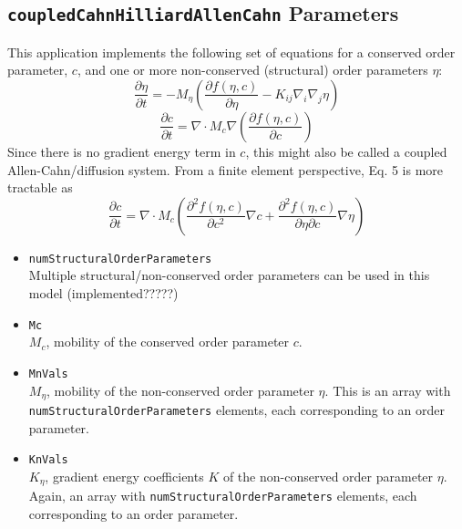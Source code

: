 \documentclass[11pt]{article}
\begin{document}
\subsection{\texttt{coupledCahnHilliardAllenCahn} Parameters}
This application implements the following set of equations for a conserved order parameter, $c$, and one or more non-conserved (structural) order parameters $\eta$:
\begin{equation}
\frac{\partial \eta}{\partial t} = -M_\eta \left( \frac{\partial f(\eta,c)}{\partial \eta} - K_{ij} \nabla_i \nabla_j \eta \right)
\end{equation}
\begin{equation}
\frac{\partial c}{\partial t} = \nabla \cdot M_c \nabla \left( \frac{\partial f(\eta,c)}{\partial c} \right)
\end{equation}
Since there is no gradient energy term in $c$, this might also be called a coupled Allen-Cahn/diffusion system.  From a finite element perspective, Eq. 5 is more tractable as
\begin{equation}
\frac{\partial c}{\partial t} = \nabla \cdot M_c \left( \frac{\partial^2 f(\eta,c)}{\partial c^2} \nabla c + \frac{\partial^2 f(\eta,c)}{\partial \eta \partial c } \nabla \eta \right)
\end{equation}
\begin{itemize}
\item \texttt{numStructuralOrderParameters}\\
	Multiple structural/non-conserved order parameters can be used in this model (implemented?????)
\item \texttt{Mc} \\
	$M_c$, mobility of the conserved order parameter $c$.
\item \texttt{MnVals} \\
	$M_\eta$, mobility of the non-conserved order parameter $\eta$.  This is an array with \texttt{numStructuralOrderParameters} elements, each corresponding to an order parameter.
\item \texttt{KnVals} \\
	$K_\eta$, gradient energy coefficients $K$ of the non-conserved order parameter $\eta$.  Again, an array with \texttt{numStructuralOrderParameters} elements, each corresponding to an order parameter.
\end{itemize}
\end{document}
